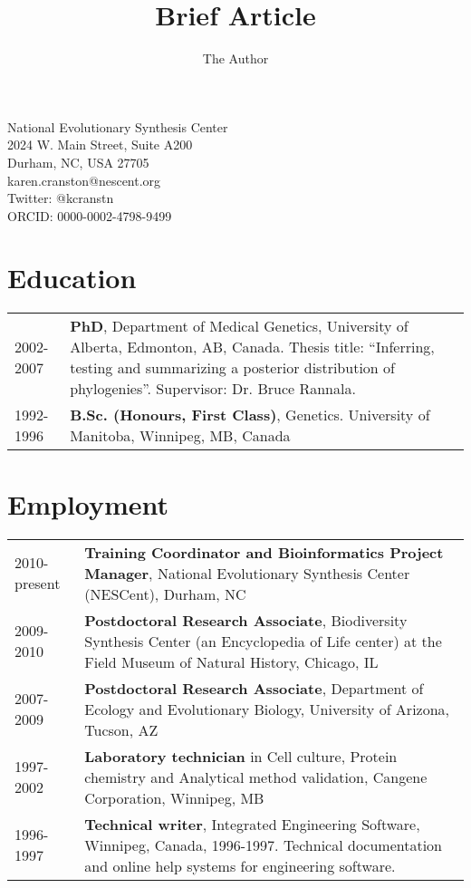 \documentclass[10pt]{article}
\title{Brief Article}
\author{The Author}
\begin{document}
\noindent National Evolutionary Synthesis Center \\
2024 W. Main Street, Suite A200  \\
Durham, NC, USA 27705 \\
karen.cranston@nescent.org \\
Twitter: @kcranstn \\
ORCID: 0000-0002-4798-9499

\section*{Education}
\begin{table}[h]
	\begin{tabular}{ p{2.0cm} p{12.4cm} }
		2002-2007 & {\bf PhD}, Department of Medical Genetics, University of Alberta, Edmonton, AB, Canada. Thesis title: ``Inferring, testing and summarizing a posterior distribution of phylogenies''. Supervisor: Dr. Bruce Rannala. \\
		1992-1996 & {\bf B.Sc. (Honours, First Class)}, Genetics. University of Manitoba, Winnipeg, MB, Canada \\
	\end{tabular}
\end{table}

\section*{Employment}
\begin{table}[h]
	\begin{tabular}{ p{2.0cm} p{12.4cm} }
		2010-present & \textbf{Training Coordinator and Bioinformatics Project Manager}, National Evolutionary Synthesis Center (NESCent), Durham, NC \\
		2009-2010 & \textbf{Postdoctoral Research Associate}, Biodiversity Synthesis Center (an Encyclopedia of Life center) at the Field Museum of Natural History, Chicago, IL  \\
		2007-2009 & \textbf{Postdoctoral Research Associate}, Department of Ecology and Evolutionary Biology, University of Arizona, Tucson, AZ \\
		1997-2002 & \textbf{Laboratory technician} in Cell culture, Protein chemistry and Analytical method validation, Cangene Corporation, Winnipeg, MB \\
		1996-1997 & \textbf{Technical writer}, Integrated Engineering Software, Winnipeg, Canada, 1996-1997. Technical documentation and online help systems for engineering software. \\
	\end{tabular}
\end{table}
\end{document}
